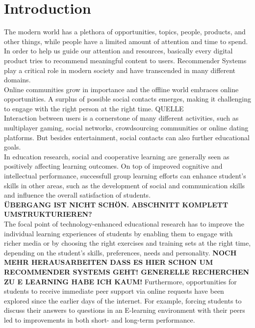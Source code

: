 \documentclass[nochapterpage,bigchapter,linedtoc,longdoc,colorback,accentcolor=tud3b,oneside]{tudreport}
\begin{document}
\chapter{Introduction}
The modern world has a plethora of opportunities, topics, people, products, and other things, while people have a limited amount of attention and time to spend. In order to help us guide our attention and resources, basically every digital product tries to recommend meaningful content to users. Recommender Systems play a critical role in modern society and have transcended in many different domains.\\
Online communities grow in importance and the offline world embraces online opportunities. A surplus of possible social contacts emerges, making it challenging to engage with the right person at the right time. QUELLE\\
Interaction between users is a cornerstone of many different activities, such as multiplayer gaming, social networks, crowdsourcing communities or online dating platforms. But besides entertainment, social contacts can also further educational goals.\\
In education research, social and cooperative learning are generally seen as positively affecting learning outcomes. \cite{bossert1982instructional, blumenfeld1996learning} On top of improved cognitive and intellectual performance, successfull group learning efforts can enhance student's skills in other areas, such as the development of social and communication skills and influence the overall satisfaction of students. \cite{zhao2004adding, maxwell2008learning}\\
\textbf{ÜBERGANG IST NICHT SCHÖN. ABSCHNITT KOMPLETT UMSTRUKTURIEREN?}\\
The focal point of technology-enhanced educational research has to improve the individual learning experiences of students by enabling them to engage with richer media or by choosing the right exercises and training sets at the right time, depending on the student's skills, preferences, needs and personality. \cite{drachsler2015panorama, erdt2015evaluating} \textbf{NOCH MEHR HERAUSARBEITEN DASS ES HIER SCHON UM RECOMMENDER SYSTEMS GEHT! GENERELLE RECHERCHEN ZU E LEARNING HABE ICH KAUM!} Furthermore, opportunities for students to receive immediate peer support via online requests have been explored since the earlier days of the internet. \cite{greer1998intelligent} For example, forcing students to discuss their answers to questions in an E-learning environment with their peers led to improvements in both short- and long-term performance. \cite{reidsema2016exploring}\\
\end{document}
